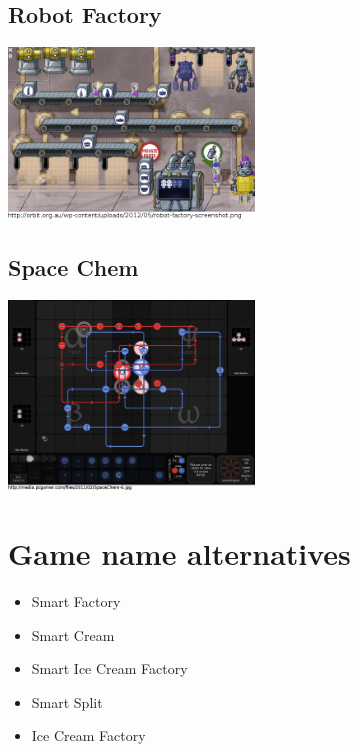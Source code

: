 \documentclass[a4paper]{scrartcl}
\begin{document}
    \begin{multicols}{2}
        \subsection{Robot Factory}
            \includegraphics[width=0.49\textwidth]{similar_games/RobotFactory}

        \subsection{Space Chem}
            \includegraphics[width=0.49\textwidth]{similar_games/SpaceChem}
    \end{multicols}

\section{Game name alternatives}
    \begin{itemize}
        \item Smart Factory
        \item Smart Cream
        \item Smart Ice Cream Factory
        \item Smart Split
        \item Ice Cream Factory
    \end{itemize}
\end{document}
